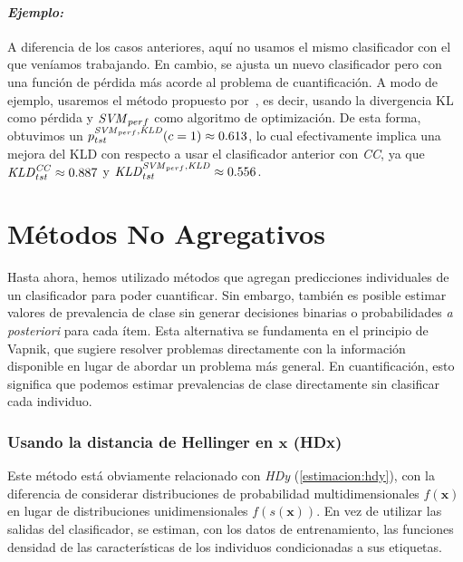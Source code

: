 \paragraph{\it Ejemplo:\/} A diferencia de los casos anteriores, aquí no usamos
el mismo clasificador con el que veníamos trabajando. En cambio, se ajusta un
nuevo clasificador pero con una función de pérdida más acorde al problema de
cuantificación. A modo de ejemplo, usaremos el método propuesto
por~\citet{esuli2010sentiment}, es decir, usando la divergencia KL como pérdida
y \({\it SVM \/}_{perf}\) como algoritmo de optimización. De esta forma,
obtuvimos un \(p^{{\it SVM \/}_{perf}, {\it KLD \/}}_{tst}(c=1) \approx 0.613\),
lo cual efectivamente implica una mejora del KLD con respecto a usar el
clasificador anterior con {\it CC}, ya que \({\it KLD \/}^{\it CC\/}_{tst}
\approx 0.887\) y \({\it KLD \/}^{{\it SVM \/}_{perf}, {\it KLD \/}}_{tst}
\approx 0.556\).

\section{Métodos No Agregativos}\label{estimacion:no_agregativos}

Hasta ahora, hemos utilizado métodos que agregan predicciones individuales de un
clasificador para poder cuantificar. Sin embargo, también es posible estimar
valores de prevalencia de clase sin generar decisiones binarias o probabilidades
{\it a posteriori\/} para cada ítem. Esta alternativa se fundamenta en el
principio de Vapnik, que sugiere resolver problemas directamente con la
información disponible en lugar de abordar un problema más general. En
cuantificación, esto significa que podemos estimar prevalencias de clase
directamente sin clasificar cada individuo.

\subsubsection{Usando la distancia de Hellinger en \(\boldsymbol{x}\)
(HDx)}\label{estimacion:hdx}

Este método está obviamente relacionado con {\it HDy\/} (\ref{estimacion:hdy}),
con la diferencia de considerar distribuciones de probabilidad
multidimensionales \(f(\boldsymbol{x})\) en lugar de distribuciones
unidimensionales \(f(s(\boldsymbol{x}))\). En vez de utilizar las salidas del
clasificador, se estiman, con los datos de entrenamiento, las funciones densidad
de las características de los individuos condicionadas a sus etiquetas.

